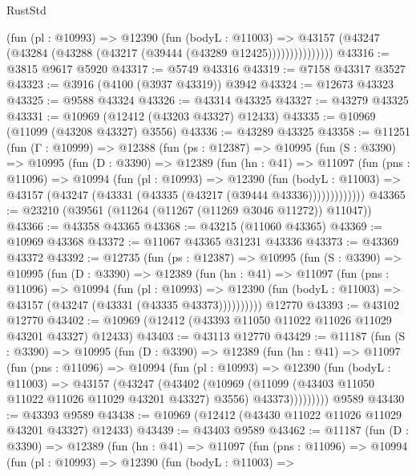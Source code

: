 \begin{lexlean}{RustStd}
\begin{coremodule}
                  (fun (pl : @10993) =>
                  @12390
                    (fun (bodyL : @11003) =>
                    @43157 (@43247 (@43284 (@43288 (@43217 (@39444 (@43289 @12425)))))))))))))))
@43316 := @3815 @9617 @5920
@43317 := @5749 @43316
@43319 := @7158 @43317 @3527
@43323 := @3916 (@4100 (@3937 @43319)) @3942
@43324 := @12673 @43323
@43325 := @9588 @43324
@43326 := @43314 @43325
@43327 := @43279 @43325
@43331 := @10969 (@12412 (@43203 @43327) @12433)
@43335 := @10969 (@11099 (@43208 @43327) @3556)
@43336 := @43289 @43325
@43358 := @11251
    (fun (Γ : @10999) =>
    @12388
      (fun (ps : @12387) =>
      @10995
        (fun (S : @3390) =>
        @10995
          (fun (D : @3390) =>
          @12389
            (fun (hn : @41) =>
            @11097
              (fun (pns : @11096) =>
              @10994
                (fun (pl : @10993) =>
                @12390
                  (fun (bodyL : @11003) =>
                  @43157 (@43247 (@43331 (@43335 (@43217 (@39444 @43336)))))))))))))
@43365 := @23210 (@39561 (@11264 (@11267 (@11269 @3046 @11272)) @11047))
@43366 := @43358 @43365
@43368 := @43215 (@11060 @43365)
@43369 := @10969 @43368
@43372 := @11067 @43365 @31231 @43336
@43373 := @43369 @43372
@43392 := @12735
    (fun (ps : @12387) =>
    @10995
      (fun (S : @3390) =>
      @10995
        (fun (D : @3390) =>
        @12389
          (fun (hn : @41) =>
          @11097
            (fun (pns : @11096) =>
            @10994
              (fun (pl : @10993) =>
              @12390 (fun (bodyL : @11003) => @43157 (@43247 (@43331 (@43335 @43373))))))))))
    @12770
@43393 := @43102 @12770
@43402 := @10969 (@12412 (@43393 @11050 @11022 @11026 @11029 @43201 @43327) @12433)
@43403 := @43113 @12770
@43429 := @11187
    (fun (S : @3390) =>
    @10995
      (fun (D : @3390) =>
      @12389
        (fun (hn : @41) =>
        @11097
          (fun (pns : @11096) =>
          @10994
            (fun (pl : @10993) =>
            @12390
              (fun (bodyL : @11003) =>
              @43157
                (@43247
                  (@43402
                    (@10969
                      (@11099 (@43403 @11050 @11022 @11026 @11029 @43201 @43327) @3556)
                      @43373)))))))))
    @9589
@43430 := @43393 @9589
@43438 := @10969 (@12412 (@43430 @11022 @11026 @11029 @43201 @43327) @12433)
@43439 := @43403 @9589
@43462 := @11187
    (fun (D : @3390) =>
    @12389
      (fun (hn : @41) =>
      @11097
        (fun (pns : @11096) =>
        @10994
          (fun (pl : @10993) =>
          @12390
            (fun (bodyL : @11003) =>

\end{coremodule}
\end{lexlean}
